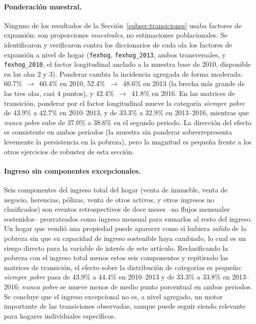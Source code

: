 \documentclass[12pt, letterpaper]{article}
\begin{document}
\paragraph{Ponderación muestral.} Ninguno de los resultados de la
Sección~\ref{subsec:transiciones} usaba factores de expansión: son
proporciones \emph{muestrales}, no estimaciones poblacionales. Se
identificaron y verificaron contra los diccionarios de cada ola los
factores de expansión a nivel de hogar (\texttt{fexhog},
\texttt{fexhog\_2013}, ambos transversales, y \texttt{fexhog\_2010}, el
factor longitudinal anclado a la muestra base de 2010, disponible en las
olas 2 y 3). Ponderar cambia la incidencia agregada de forma moderada:
60.7\%~$\rightarrow$~60.4\% en 2010, 52.4\%~$\rightarrow$~48.6\% en 2013
(la brecha más grande de las tres olas, casi 4 puntos), y
42.4\%~$\rightarrow$~41.8\% en 2016. En las matrices de transición,
ponderar por el factor longitudinal mueve la categoría \emph{siempre
pobre} de 43.9\% a 42.7\% en 2010--2013, y de 33.3\% a 32.9\% en
2013--2016, mientras que \emph{nunca pobre} sube de 37.0\% a 38.6\% en el
segundo periodo. La dirección del efecto es consistente en ambos periodos
(la muestra sin ponderar sobrerrepresenta levemente la persistencia en la
pobreza), pero la magnitud es pequeña frente a los otros ejercicios de
robustez de esta sección.

\paragraph{Ingreso sin componentes excepcionales.} Seis componentes del
ingreso total del hogar (venta de inmueble, venta de negocio, herencias,
pólizas, venta de otros activos, y otros ingresos no clasificados) son
eventos retrospectivos de doce meses --no flujos mensuales sostenidos--
prorrateados como ingreso mensual para sumarlos al resto del ingreso. Un
hogar que vendió una propiedad puede aparecer como si hubiera
\emph{salido} de la pobreza sin que su capacidad de ingreso sostenible
haya cambiado, lo cual es un riesgo directo para la variable de interés de
este artículo. Reclasificando la pobreza con el ingreso total menos estos
seis componentes y repitiendo las matrices de transición, el efecto sobre
la distribución de categorías es pequeño: \emph{siempre pobre} pasa de
43.9\% a 44.4\% en 2010--2013 y de 33.3\% a 33.8\% en 2013--2016;
\emph{nunca pobre} se mueve menos de medio punto porcentual en ambos
periodos. Se concluye que el ingreso excepcional no es, a nivel agregado,
un motor importante de las transiciones observadas, aunque puede seguir
siendo relevante para hogares individuales específicos.
\end{document}
